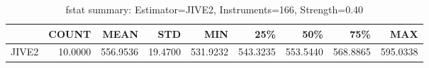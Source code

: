 \begin{table}[ht]
\centering
\caption{fstat summary: Estimator=JIVE2, Instruments=166, Strength=0.40}
\begin{tabular}{lrrrrrrrr}
\toprule
 & COUNT & MEAN & STD & MIN & 25\% & 50\% & 75\% & MAX \\
\midrule
JIVE2 & 10.0000 & 556.9536 & 19.4700 & 531.9232 & 543.3235 & 553.5440 & 568.8865 & 595.0338 \\
\bottomrule
\end{tabular}
\end{table}
